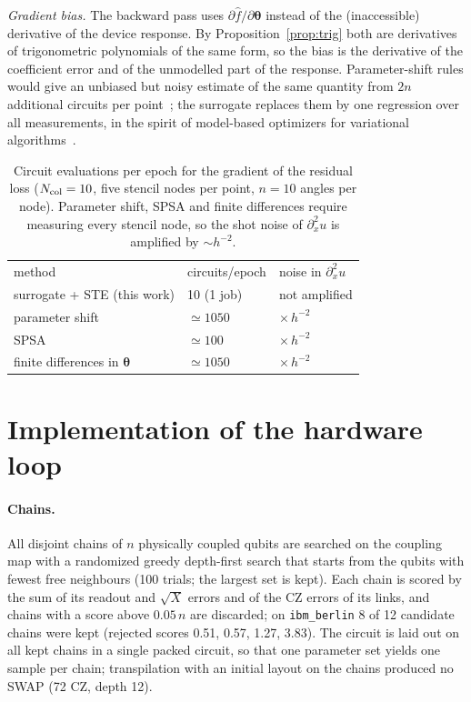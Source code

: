\documentclass[floatfix,aps,pra,twocolumn,superscriptaddress,10pt,nofootinbib]{revtex4-2}
\newcommand{\Ncol}{N_{\rm col}}
\newcounter{algorithm}
\begin{document}
\begin{appendices}
\emph{Gradient bias.} The backward pass uses $\partial\hat f/\partial\bm\theta$ instead of the (inaccessible) derivative of the device response. By Proposition~\ref{prop:trig} both are derivatives of trigonometric polynomials of the same form, so the bias is the derivative of the coefficient error and of the unmodelled part of the response. Parameter-shift rules would give an unbiased but noisy estimate of the same quantity from $2n$ additional circuits per point~\cite{schuld2019evaluating,wierichs2022general}; the surrogate replaces them by one regression over all measurements, in the spirit of model-based optimizers for variational algorithms~\cite{sung2020using,nakanishi2020sequential,ostaszewski2021structure}.

\begin{table}[b]
\caption{\justifying Circuit evaluations per epoch for the gradient of the residual loss ($\Ncol=10$, five stencil nodes per point, $n=10$ angles per node). Parameter shift, SPSA and finite differences require measuring every stencil node, so the shot noise of $\partial_x^2u$ is amplified by $\sim h^{-2}$.}
\label{tab:cost}
\setlength{\tabcolsep}{2pt}
\footnotesize
\begin{ruledtabular}
\begin{tabular}{lll}
method & circuits/epoch & noise in $\partial_x^2u$\\
\colrule
surrogate + STE (this work) & 10 (1 job) & not amplified\\
parameter shift & $\simeq1050$ & $\times\,h^{-2}$\\
SPSA & $\simeq100$ & $\times\,h^{-2}$\\
finite differences in $\bm\theta$ & $\simeq1050$ & $\times\,h^{-2}$\\
\end{tabular}
\end{ruledtabular}
\end{table}

\section{Implementation of the hardware loop}\label{app:hil_impl}
\paragraph{Chains.} All disjoint chains of $n$ physically coupled qubits are searched on the coupling map with a randomized greedy depth-first search that starts from the qubits with fewest free neighbours (100 trials; the largest set is kept). Each chain is scored by the sum of its readout and $\sqrt X$ errors and of the CZ errors of its links, and chains with a score above $0.05\,n$ are discarded; on \texttt{ibm\_berlin} 8 of 12 candidate chains were kept (rejected scores 0.51, 0.57, 1.27, 3.83). The circuit is laid out on all kept chains in a single packed circuit, so that one parameter set yields one sample per chain; transpilation with an initial layout on the chains produced no SWAP (72 CZ, depth 12).


\end{appendices}
\end{document}
